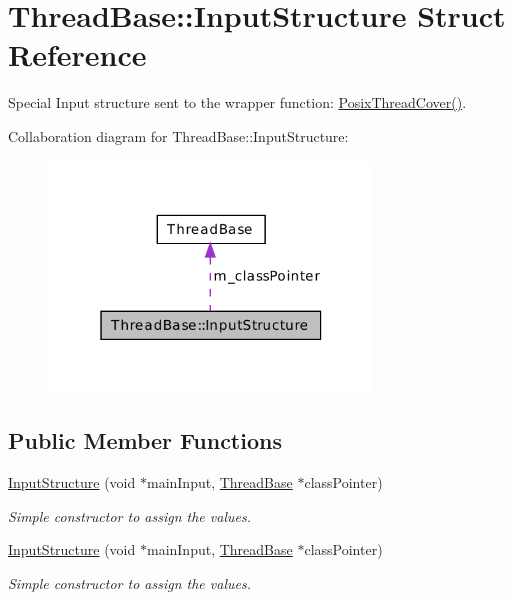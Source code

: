 \hypertarget{struct_thread_base_1_1_input_structure}{\section{Thread\-Base\-:\-:Input\-Structure Struct Reference}
\label{struct_thread_base_1_1_input_structure}
}


Special Input structure sent to the wrapper function\-: \hyperlink{class_thread_base_a2567acd55e8bbdbf8ac90a8f77bb4943}{Posix\-Thread\-Cover()}.  




Collaboration diagram for Thread\-Base\-:\-:Input\-Structure\-:\nopagebreak
\begin{figure}[H]
\begin{center}
\leavevmode
\includegraphics[width=244pt]{struct_thread_base_1_1_input_structure__coll__graph}
\end{center}
\end{figure}
\subsection*{Public Member Functions}
\begin{DoxyCompactItemize}
\item 
\hyperlink{struct_thread_base_1_1_input_structure_a05703c0e565f0d0616e5439d4bcbd2f7}{Input\-Structure} (void $\ast$main\-Input, \hyperlink{class_thread_base}{Thread\-Base} $\ast$class\-Pointer)
\begin{DoxyCompactList}\small\item\em Simple constructor to assign the values. \end{DoxyCompactList}\item 
\hyperlink{struct_thread_base_1_1_input_structure_a05703c0e565f0d0616e5439d4bcbd2f7}{Input\-Structure} (void $\ast$main\-Input, \hyperlink{class_thread_base}{Thread\-Base} $\ast$class\-Pointer)
\begin{DoxyCompactList}\small\item\em Simple constructor to assign the values. \end{DoxyCompactList}\end{DoxyCompactItemize}
